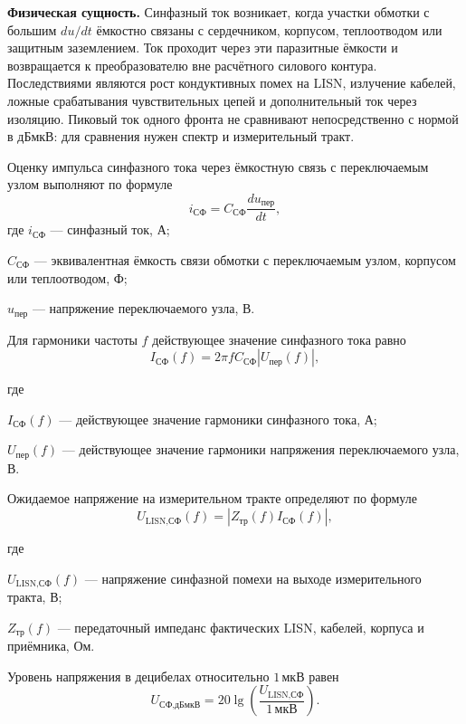 \documentclass[14pt,a4paper]{extarticle}
\newcommand{\phys}{\par\noindent\textbf{Физическая сущность.} }
\newenvironment{whereblock}
 {\par\noindent где\par
  \begin{list}{}{\setlength{\leftmargin}{12.5mm}
                  \setlength{\itemindent}{-12.5mm}
                  \setlength{\itemsep}{0pt}
                  \setlength{\parsep}{0pt}
                  \setlength{\topsep}{0pt}}}
 {\end{list}}
\newcommand{\whereitem}[2]{\item[] #1 --- #2}
\begin{document}
\phys Синфазный ток возникает, когда участки обмотки с большим
$du/dt$ ёмкостно связаны с сердечником, корпусом, теплоотводом или защитным
заземлением. Ток проходит через эти паразитные ёмкости и возвращается к
преобразователю вне расчётного силового контура. Последствиями являются рост
кондуктивных помех на LISN, излучение кабелей, ложные срабатывания
чувствительных цепей и дополнительный ток через изоляцию. Пиковый ток одного
фронта не сравнивают непосредственно с нормой в дБмкВ: для сравнения нужен
спектр и измерительный тракт.

Оценку импульса синфазного тока через ёмкостную связь с переключаемым
узлом выполняют по формуле
\begin{equation}
 i_{\text{СФ}}=
 C_{\text{СФ}}\frac{du_{\text{пер}}}{dt},
 \label{eq:common-mode-current}
\end{equation}
где $i_{\text{СФ}}$ --- синфазный ток, А;\par\noindent
$C_{\text{СФ}}$ --- эквивалентная ёмкость связи обмотки с
переключаемым узлом, корпусом или теплоотводом, Ф;\par\noindent
$u_{\text{пер}}$ --- напряжение переключаемого узла, В.

Для гармоники частоты $f$ действующее значение синфазного тока равно
\begin{equation}
 I_{\text{СФ}}(f)=
 2\pi f C_{\text{СФ}}|U_{\text{пер}}(f)|,
 \label{eq:common-mode-spectrum}
\end{equation}
\begin{whereblock}
\whereitem{$I_{\text{СФ}}(f)$}{действующее значение гармоники синфазного
тока, А;}
\whereitem{$U_{\text{пер}}(f)$}{действующее значение гармоники напряжения
переключаемого узла, В.}
\end{whereblock}

Ожидаемое напряжение на измерительном тракте определяют по формуле
\begin{equation}
 U_{\text{LISN,СФ}}(f)=
 \left|Z_{\text{тр}}(f)I_{\text{СФ}}(f)\right|,
 \label{eq:lisn-common-mode-voltage}
\end{equation}
\begin{whereblock}
\whereitem{$U_{\text{LISN,СФ}}(f)$}{напряжение синфазной помехи на выходе
измерительного тракта, В;}
\whereitem{$Z_{\text{тр}}(f)$}{передаточный импеданс фактических LISN,
кабелей, корпуса и приёмника, Ом.}
\end{whereblock}

Уровень напряжения в децибелах относительно $1\,\text{мкВ}$ равен
\begin{equation}
 U_{\text{СФ,дБмкВ}}=
 20\lg\left(
 \frac{U_{\text{LISN,СФ}}}{1\,\text{мкВ}}
 \right).
 \label{eq:dbuv}
\end{equation}
\end{document}
